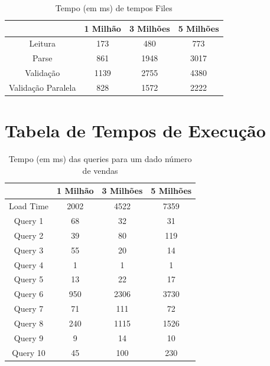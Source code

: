 \documentclass[a4paper]{report}
\begin{document}
\begin{table}[H]
    \begin{center}
        \begin{tabular}{| c | c | c | c |}
            \hline
            & 1 Milhão & 3 Milhões & 5 Milhões \\
            \hline
            Leitura & 173 & 480 & 773 \\
            \hline
            Parse & 861 & 1948 & 3017 \\
            \hline
            Validação & 1139 & 2755 & 4380 \\
            \hline
            Validação Paralela & 828 & 1572 & 2222 \\
            \hline

        \end{tabular}
        \caption{Tempo (em ms) de tempos Files}
        \label{tab:Files}
    \end{center}
\end{table}


\chapter{Tabela de Tempos de Execução}

\begin{table}[H]
    \begin{center}
        \begin{tabular}{| c | c | c | c |}
            \hline
            & 1 Milhão & 3 Milhões & 5 Milhões \\
            \hline
            Load Time & 2002 & 4522 & 7359 \\
            \hline
            Query 1 & 68 & 32 & 31 \\
            \hline
            Query 2 & 39 & 80 & 119 \\
            \hline
            Query 3 & 55 & 20 & 14 \\
            \hline
            Query 4 & 1 & 1 & 1 \\
            \hline
            Query 5 & 13 & 22 & 17 \\
            \hline
            Query 6 & 950 & 2306 & 3730 \\
            \hline
            Query 7 & 71 & 111 & 72 \\
            \hline
            Query 8 & 240 & 1115 & 1526 \\
            \hline
            Query 9 & 9 & 14 & 10 \\
            \hline
            Query 10 & 45 & 100 & 230 \\
            \hline

        \end{tabular}
        \caption{Tempo (em ms) das queries para um dado número de vendas}
        \label{tab:benches}
    \end{center}
\end{table}
\end{document}
